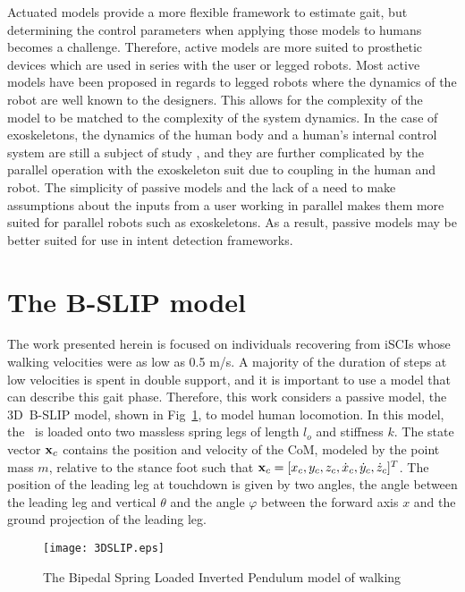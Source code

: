 Actuated models provide a more flexible framework to estimate gait, but determining the control parameters when applying those models to humans becomes a challenge. Therefore, active models are more suited to prosthetic devices which are used in series with the user or legged robots. Most active models have been proposed in regards to legged robots where the dynamics of the robot are well known to the designers. This allows for the complexity of the model to be matched to the complexity of the system dynamics. In the case of exoskeletons, the dynamics of the human body and a human's internal control system are still a subject of study \cite{wolpert1998internal, dounskaia2005internal, kording2007decision}, and they are further complicated by the parallel operation with the exoskeleton suit due to coupling in the human and robot. The simplicity of passive models and the lack of a need to make assumptions about the inputs from a user working in parallel makes them more suited for parallel robots such as exoskeletons. As a result, passive models may be better suited for use in intent detection frameworks. 

\section{The B-SLIP model}\label{sec:bslip_model}
The work presented herein is focused on individuals recovering from iSCIs whose walking velocities were as low as 0.5 m/s. A majority of the duration of steps at low velocities is spent in double support, and it is important to use a model that can describe this gait phase. Therefore, this work considers a passive model, the 3D~B-SLIP model, shown in Fig~\ref{fig:slip}, to model human locomotion. In this model, the \COM~is loaded onto two massless spring legs of length $ l_o $ and stiffness $ k $. The state vector $ \mathbf{x}_{c} $ contains the position and velocity of the CoM, modeled by the point mass $ m $, relative to the stance foot such that $ \mathbf{x}_{c} = [x_{c} ,y_{c} ,z_{c} ,\dot{x}_{c} ,\dot{y}_{c} ,\dot{z}_{c}]^T $. The position of the leading leg at touchdown is given by two angles, the angle between the leading leg and vertical $ \theta $ and the angle $ \varphi $ between the forward axis $ x $  and the ground projection of the leading leg.
%
\begin{figure}
	\centering
	\texttt{[image: 3DSLIP.eps]}
	\caption[The Bipedal Spring Loaded Inverted Pendulum]{The Bipedal Spring Loaded Inverted Pendulum \cite{liu2015dynamic} model of walking}\label{fig:slip}
\end{figure}
%

